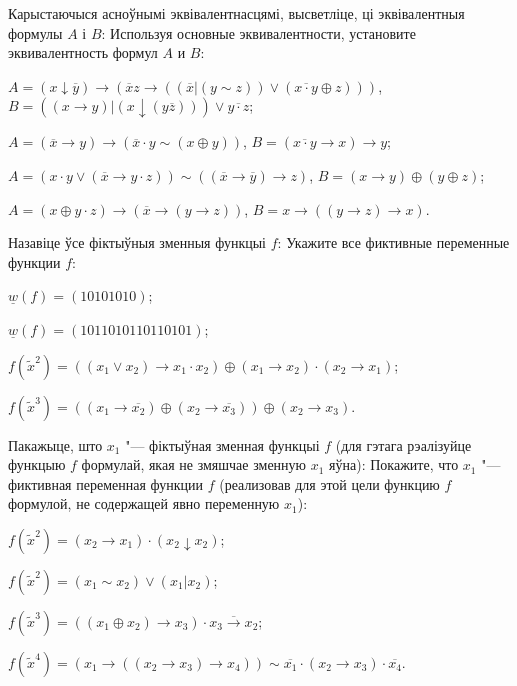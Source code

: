 \documentclass[12pt, a4paper]{article}
\begin{document}
\begin{problemList}
\smallskip

\problemItemWithCommonPart
{Карыстаючыся асноўнымі эквівалентнасцямі, высветліце, ці эквівалентныя формулы $A$ і $B$:}
{Используя основные эквивалентности, установите эквивалентность формул $A$ и $B$:}
{%
\begin{belarusianEnumerate}
    \item $A=(x\downarrow \overline{y})\rightarrow (\overline{x}z\rightarrow ((\overline{x}|(y\sim z))\vee(\overline{x\cdot y}\oplus z)))$, $B=((x\rightarrow y)|(x\downarrow (y\overline{z})))\vee \overline{y\cdot z}$;
    \item $A=(\overline{x}\rightarrow y)\rightarrow (\overline{x}\cdot y\sim(x\oplus y))$, $B=(\overline{x\cdot y}\rightarrow x)\rightarrow y$;
    \item $A=(x\cdot y\vee(\overline{x}\rightarrow y\cdot z))\sim((\overline{x}\rightarrow\overline{y})\rightarrow z)$, $B=(x\rightarrow y)\oplus(y\oplus z)$;
    \item $A=(x\oplus y\cdot z)\rightarrow(\overline{x}\rightarrow(y\rightarrow z))$, $B=x\rightarrow((y\rightarrow z)\rightarrow x)$.
\end{belarusianEnumerate}
}

\smallskip

\problemItemWithCommonPart
{Назавіце ўсе фіктыўныя зменныя функцыі $f$:}
{Укажите все фиктивные переменные функции $f$:}
{%
\begin{belarusianEnumerate}
    \item $\underline{w}(f)=(10101010)$;
    \item $\underline{w}(f)=(1011010110110101)$;
    \item $f(\tilde x^2)=((x_1\vee x_2)\rightarrow x_1\cdot x_2)\oplus(x_1\rightarrow x_2)\cdot (x_2 \rightarrow x_1)$;
    \item $f(\tilde x^3)=((x_1 \rightarrow \overline{x_2})\oplus (x_2\rightarrow \overline{x_3}))\oplus(x_2 \rightarrow x_3)$.
\end{belarusianEnumerate}
}

\smallskip

\problemItemWithCommonPart
{Пакажыце, што $x_1$ "--- фіктыўная зменная функцыі $f$
(для гэтага рэалізуйце функцыю $f$ формулай, якая не змяшчае зменную $x_1$ яўна):}
{Покажите, что $x_1$ "--- фиктивная переменная функции $f$
(реализовав для этой цели функцию $f$ формулой, не содержащей явно переменную $x_1$):}
{%
\begin{belarusianEnumerate}
    \item $f(\tilde x^2)=(x_2 \rightarrow x_1)\cdot (x_2\downarrow x_2)$;
    \item $f(\tilde x^2)=(x_1\sim x_2)\vee(x_1 | x_2)$;
    \item $f(\tilde x^3)=((x_1 \oplus x_2)\rightarrow x_3)\cdot \overline{x_3\rightarrow x_2}$;
    \item $f(\tilde x^4)=(x_1 \rightarrow ((x_2 \rightarrow x_3)\rightarrow x_4))\sim \overline{x_1}\cdot (x_2 \rightarrow x_3)\cdot \overline{x_4}$.
\end{belarusianEnumerate}
}


\end{problemList}
\end{document}
